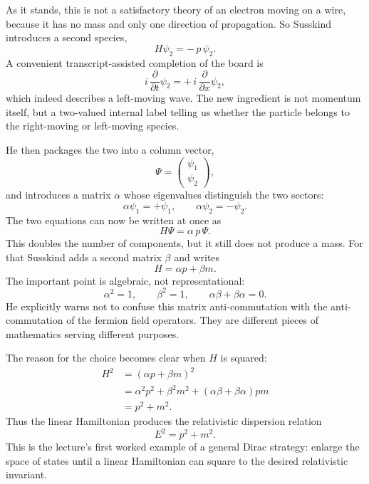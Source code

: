 As it stands, this is not a satisfactory theory of an electron moving on a wire, because it has no mass and only one direction of propagation. So Susskind introduces a second species,
\begin{equation}
H\psi_2=-\,p\,\psi_2.
\end{equation}
A convenient transcript-assisted completion of the board is
\begin{equation}
i\,\frac{\partial}{\partial t}\psi_2
=
+\,i\,\frac{\partial}{\partial x}\psi_2,
\end{equation}
which indeed describes a left-moving wave. The new ingredient is not momentum itself, but a two-valued internal label telling us whether the particle belongs to the right-moving or left-moving species.

He then packages the two into a column vector,
\begin{equation}
\Psi=
\begin{pmatrix}
\psi_1\\
\psi_2
\end{pmatrix},
\end{equation}
and introduces a matrix \(\alpha\) whose eigenvalues distinguish the two sectors:
\begin{equation}
\alpha\psi_1=+\psi_1,
\qquad
\alpha\psi_2=-\psi_2.
\end{equation}
The two equations can now be written at once as
\begin{equation}
H\Psi=\alpha\,p\,\Psi.
\end{equation}
This doubles the number of components, but it still does not produce a mass. For that Susskind adds a second matrix \(\beta\) and writes
\begin{equation}
H=\alpha p+\beta m.
\end{equation}
The important point is algebraic, not representational:
\begin{equation}
\alpha^2=1,
\qquad
\beta^2=1,
\qquad
\alpha\beta+\beta\alpha=0.
\end{equation}
He explicitly warns not to confuse this matrix anti-commutation with the anti-commutation of the fermion field operators. They are different pieces of mathematics serving different purposes.

The reason for the choice becomes clear when \(H\) is squared:
\begin{align}
H^2
&=
(\alpha p+\beta m)^2 \\
&=
\alpha^2 p^2+\beta^2 m^2+(\alpha\beta+\beta\alpha)pm \\
&=
p^2+m^2.
\end{align}
Thus the linear Hamiltonian produces the relativistic dispersion relation
\begin{equation}
E^2=p^2+m^2.
\end{equation}
This is the lecture's first worked example of a general Dirac strategy: enlarge the space of states until a linear Hamiltonian can square to the desired relativistic invariant.

